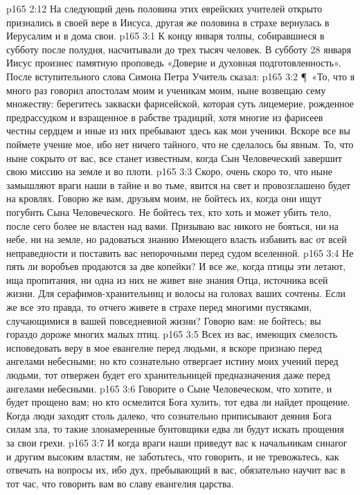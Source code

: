 \vs p165 2:12 На следующий день половина этих еврейских учителей открыто признались в своей вере в Иисуса, другая же половина в страхе вернулась в Иерусалим и в дома свои.
\vs p165 3:1 К концу января толпы, собиравшиеся в субботу после полудня, насчитывали до трех тысяч человек. В субботу 28 января Иисус произнес памятную проповедь «Доверие и духовная подготовленность». После вступительного слова Симона Петра Учитель сказал:
\vs p165 3:2 \P\ «То, что я много раз говорил апостолам моим и ученикам моим, ныне возвещаю сему множеству: берегитесь закваски фарисейской, которая суть лицемерие, рожденное предрассудком и взращенное в рабстве традиций, хотя многие из фарисеев честны сердцем и иные из них пребывают здесь как мои ученики. Вскоре все вы поймете учение мое, ибо нет ничего тайного, что не сделалось бы явным. То, что ныне сокрыто от вас, все станет известным, когда Сын Человеческий завершит свою миссию на земле и во плоти.
\vs p165 3:3 Скоро, очень скоро то, что ныне замышляют враги наши в тайне и во тьме, явится на свет и провозглашено будет на кровлях. Говорю же вам, друзьям моим, не бойтесь их, когда они ищут погубить Сына Человеческого. Не бойтесь тех, кто хоть и может убить тело, после сего более не властен над вами. Призываю вас никого не бояться, ни на небе, ни на земле, но радоваться знанию Имеющего власть избавить вас от всей неправедности и поставить вас непорочными перед судом вселенной.
\vs p165 3:4 Не пять ли воробъев продаются за две копейки? И все же, когда птицы эти летают, ища пропитания, ни одна из них не живет вне знания Отца, источника всей жизни. Для серафимов\hyp{}хранительниц и волосы на головах ваших сочтены. Если же все это правда, то отчего живете в страхе перед многими пустяками, случающимися в вашей повседневной жизни? Говорю вам: не бойтесь; вы гораздо дороже многих малых птиц.
\vs p165 3:5 Всех из вас, имеющих смелость исповедовать веру в мое евангелие перед людьми, я вскоре признаю перед ангелами небесными; но кто сознательно отвергает истину моих учений перед людьми, тот отвержен будет его хранительницей предназначения даже перед ангелами небесными.
\vs p165 3:6 Говорите о Сыне Человеческом, что хотите, и будет прощено вам; но кто осмелится Бога хулить, тот едва ли найдет прощение. Когда люди заходят столь далеко, что сознательно приписывают деяния Бога силам зла, то такие злонамеренные бунтовщики едва ли будут искать прощения за свои грехи.
\vs p165 3:7 И когда враги наши приведут вас к начальникам синагог и другим высоким властям, не заботьтесь, что говорить, и не тревожьтесь, как отвечать на вопросы их, ибо дух, пребывающий в вас, обязательно научит вас в тот час, что говорить вам во славу евангелия царства.
